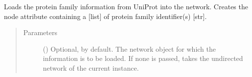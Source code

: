 \documentclass[letterpaper,10pt,english]{sphinxmanual}
\begin{document}
\begin{fulllineitems}
\begin{fulllineitems}
\begin{quote}
\begin{description}
\end{description}\end{quote}

\end{fulllineitems}


\begin{fulllineitems}
\label{\detokenize{reference:pypath.main.PyPath.load_pepcyber}}
\end{fulllineitems}


\begin{fulllineitems}
\label{\detokenize{reference:pypath.main.PyPath.load_pfam}}
Loads the protein family information from UniProt into the
network. Creates the node attribute  containing a
{[}list{]} of protein family identifier(s) {[}str{]}.
\begin{quote}\begin{description}
\item[{Parameters}] \leavevmode
{} () \textendash{} Optional,  by default. The network object for which
the information is to be loaded. If none is passed, takes
the undirected network of the current instance.

\end{description}\end{quote}

\end{fulllineitems}



\end{fulllineitems}
\end{document}
